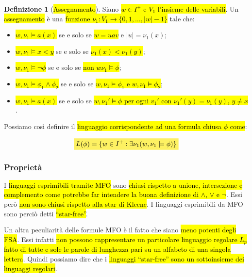 \documentclass[a4paper,11pt,oneside]{article}
\theoremstyle{plain}
\theoremstyle{definition}
\newtheorem{defn}{Definizione}[section]
\theoremstyle{remark}
\newcommand{\mhl}[1]{\colorbox{hlcolor}{$\displaystyle #1$}}
\begin{document}
\begin{defn}[\hl{Assegnamento}]\label{def:mfo-assegnamento}
  Siano \hl{$w\in I^+$ e $V_1$ l'insieme delle variabili}. Un \hl{assegnamento}
  è una \hl{funzione $\nu_1 : V_1 \to \{0,1,\ldots,|w|-1\}$} tale che:

  \begin{itemize}
    \item \hl{$w,\nu_1 \models a(x)$} se e solo se \hl{$w = uav$} e
      $|u| = \nu_1(x)$;
    \item \hl{$w,\nu_1 \models x < y$} se e solo se \hl{$\nu_1(x) < \nu_1(y)$};
    \item \hl{$w,\nu_1 \models \neg\phi$} se e solo se \hl{non
      $w\nu_1 \models \phi$};
    \item \hl{$w,\nu_1 \models \phi_1 \land \phi_2$} se e solo se
      \hl{$w,\nu_1 \models \phi_1$ e $w,\nu_1 \models \phi_2$};
    \item \hl{$w,\nu_1 \models a(x)$} se e solo se \hl{$w,\nu_1' \models \phi$
      per ogni $v_1'$ con $\nu_1'(y) = \nu_1(y)$, $y \neq x$}.
  \end{itemize}
\end{defn}

Possiamo così definire il \hl{linguaggio corrispondente ad una formula chiusa
$\phi$ come}:

\begin{equation}
  \mhl{ L(\phi) = \{w\in I^+ : \exists\nu_1 (w, \nu_1 \models \phi)\} }
\end{equation}

\subsubsection{Proprietà}\label{sec:mfo-proprietà}

I \hl{linguaggi esprimibili tramite MFO} sono \hl{chiusi rispetto a unione,
intersezione e complemento come potrebbe far intendere la buona definizione di
$\land$, $\lor$ e $\neg$}. Essi però \hl{non sono chiusi rispetto alla star di
Kleene}. I linguaggi esprimibili da MFO sono perciò detti \hl{``star-free''}.

Un altra peculiarità delle formule MFO è il fatto che siano \hl{meno potenti
degli FSA\@}. Essi infatti \hl{non possono rappresentare un particolare
linguaggio regolare $L_p$ fatto di tutte e sole le parole di lunghezza pari su
un alfabeto di una singola lettera}. Quindi possiamo dire che i \hl{linguaggi
``star-free'' sono un sottoinsieme dei linguaggi regolari}.
\end{document}
